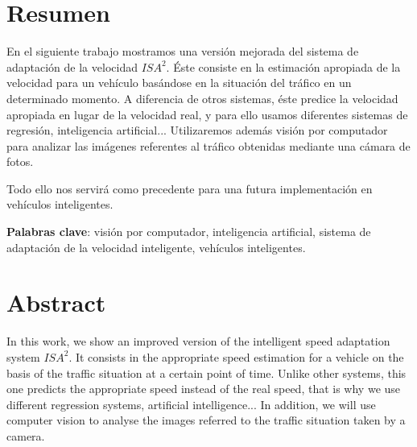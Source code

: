 \chapter{Resumen}


En el siguiente trabajo mostramos una versión mejorada del sistema de adaptación de la velocidad $ISA^{2}$. Éste consiste en la estimación apropiada de la velocidad para un vehículo basándose en la situación del tráfico en un determinado momento. A diferencia de otros sistemas, éste predice la velocidad apropiada en lugar de la velocidad real, y para ello usamos diferentes sistemas de regresión, inteligencia artificial... Utilizaremos además visión por computador para analizar las imágenes referentes al tráfico obtenidas mediante una cámara de fotos.

Todo ello nos servirá como precedente para una futura implementación en vehículos inteligentes.

\vspace{0.5cm}

\textbf{Palabras clave}: visión por computador, inteligencia artificial, sistema de adaptación de la velocidad inteligente, vehículos inteligentes.

\newpage
\thispagestyle{empty}
\hspace*{0.5cm}
\newpage

\chapter{Abstract}
In this work, we show an improved version of the intelligent speed adaptation system  $ISA^{2}$. It consists in the appropriate speed estimation for a vehicle on the basis of the traffic situation at a certain point of time. Unlike other systems, this one predicts the appropriate speed instead of the real speed, that is why we use different regression systems, artificial intelligence... In addition, we will use computer vision to analyse the images referred to the traffic situation taken by a camera.

